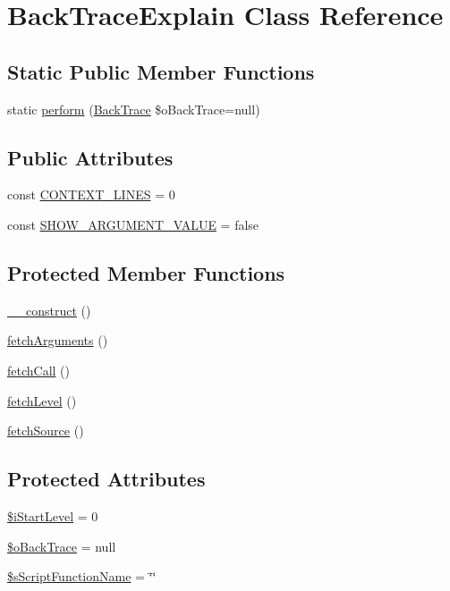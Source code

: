 \hypertarget{class_back_trace_explain}{
\section{BackTraceExplain Class Reference}
\label{class_back_trace_explain}
}
\subsection*{Static Public Member Functions}
\begin{CompactItemize}
\item 
static \hyperlink{class_back_trace_explain_4e3e5944ef133f107e9ebc98f1abde0a}{perform} (\hyperlink{class_back_trace}{BackTrace} \$oBackTrace=null)
\end{CompactItemize}
\subsection*{Public Attributes}
\begin{CompactItemize}
\item 
const \hyperlink{class_back_trace_explain_c2f50be66ed7bc246f834cbdefc0c522}{CONTEXT\_\-LINES} = 0
\item 
const \hyperlink{class_back_trace_explain_51d167de814dda92b83aa6518e396fc3}{SHOW\_\-ARGUMENT\_\-VALUE} = false
\end{CompactItemize}
\subsection*{Protected Member Functions}
\begin{CompactItemize}
\item 
\hyperlink{class_back_trace_explain_095c5d389db211932136b53f25f39685}{\_\-\_\-construct} ()
\item 
\hyperlink{class_back_trace_explain_41bebe0f7ba60f78673c97ea6f223a95}{fetchArguments} ()
\item 
\hyperlink{class_back_trace_explain_5a465523eda7c24e3dcef8d111aae02d}{fetchCall} ()
\item 
\hyperlink{class_back_trace_explain_b47849ae8b333456a7406a86fce7cc30}{fetchLevel} ()
\item 
\hyperlink{class_back_trace_explain_a2d4a5dae4173cbd5465251c211e54eb}{fetchSource} ()
\end{CompactItemize}
\subsection*{Protected Attributes}
\begin{CompactItemize}
\item 
\hyperlink{class_back_trace_explain_603094fc8605d016f648673dd6c18f63}{\$iStartLevel} = 0
\item 
\hyperlink{class_back_trace_explain_4c84cc2144d3b48bc446b407a526218b}{\$oBackTrace} = null
\item 
\hyperlink{class_back_trace_explain_f85538ad4277fe0063e5be10bf328bc5}{\$sScriptFunctionName} = \char`\"{}\char`\"{}
\end{CompactItemize}
